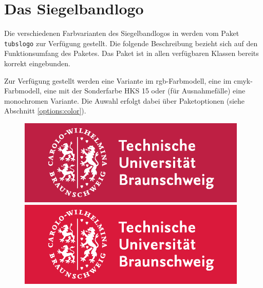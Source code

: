 \chapter{Das Siegelbandlogo}

Die verschiedenen Farbvarianten des Siegelbandlogos in \tubslatex werden
vom Paket \lstinline{tubslogo} zur Verfügung gestellt.
Die folgende Beschreibung bezieht sich auf den Funktionsumfang des Paketes.
Das Paket ist in allen verfügbaren Klassen bereits korrekt eingebunden.

Zur Verfügung gestellt werden eine Variante im rgb-Farbmodell, eine im
cmyk-Farbmodell, eine mit der Sonderfarbe HKS 15 oder (für Ausnahmefälle)
eine monochromen Variante.
Die Auwahl erfolgt dabei über Paketoptionen
(siehe Abschnitt \ref{options:color}).

\begin{figure}[!ht]
\begin{minipage}{0.5\textwidth}
  \centering
  \includegraphics[width=\tubslogoBaseWidth]{TUBraunschweig_RGB}
\end{minipage}
\begin{minipage}{0.5\textwidth}
  \centering
  \includegraphics[width=\tubslogoBaseWidth]{TUBraunschweig_4C}
\end{minipage}


\end{figure}
